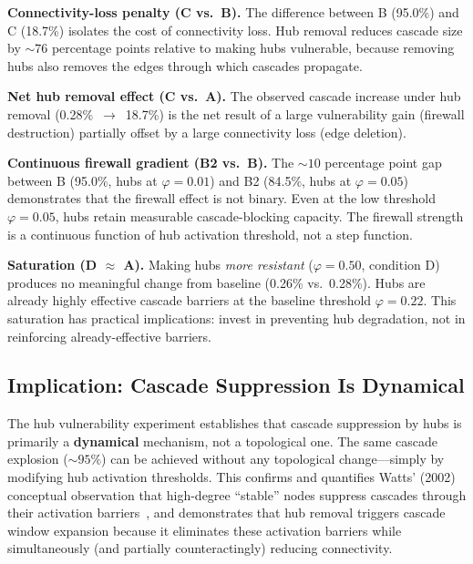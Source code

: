 \documentclass[aps,pre,twocolumn,superscriptaddress,showpacs]{revtex4-2}
\begin{document}
\textbf{Connectivity-loss penalty (C vs.\ B).} The difference between B (95.0\%) and C (18.7\%) isolates the cost of connectivity loss. Hub removal reduces cascade size by ${\sim}76$ percentage points relative to making hubs vulnerable, because removing hubs also removes the edges through which cascades propagate.

\textbf{Net hub removal effect (C vs.\ A).} The observed cascade increase under hub removal (0.28\%~$\to$~18.7\%) is the net result of a large vulnerability gain (firewall destruction) partially offset by a large connectivity loss (edge deletion).

\textbf{Continuous firewall gradient (B2 vs.\ B).} The ${\sim}10$ percentage point gap between B (95.0\%, hubs at $\varphi=0.01$) and B2 (84.5\%, hubs at $\varphi=0.05$) demonstrates that the firewall effect is not binary. Even at the low threshold $\varphi=0.05$, hubs retain measurable cascade-blocking capacity. The firewall strength is a continuous function of hub activation threshold, not a step function.

\textbf{Saturation (D $\approx$ A).} Making hubs \emph{more resistant} ($\varphi=0.50$, condition D) produces no meaningful change from baseline (0.26\% vs.\ 0.28\%). Hubs are already highly effective cascade barriers at the baseline threshold $\varphi=0.22$. This saturation has practical implications: invest in preventing hub degradation, not in reinforcing already-effective barriers.

\subsection{Implication: Cascade Suppression Is Dynamical}

The hub vulnerability experiment establishes that cascade suppression by hubs is primarily a \textbf{dynamical} mechanism, not a topological one. The same cascade explosion ($\sim 95\%$) can be achieved without any topological change---simply by modifying hub activation thresholds. This confirms and quantifies Watts' (2002) conceptual observation that high-degree ``stable'' nodes suppress cascades through their activation barriers~\cite{Watts2002}, and demonstrates that hub removal triggers cascade window expansion because it eliminates these activation barriers while simultaneously (and partially counteractingly) reducing connectivity.

\end{document}

